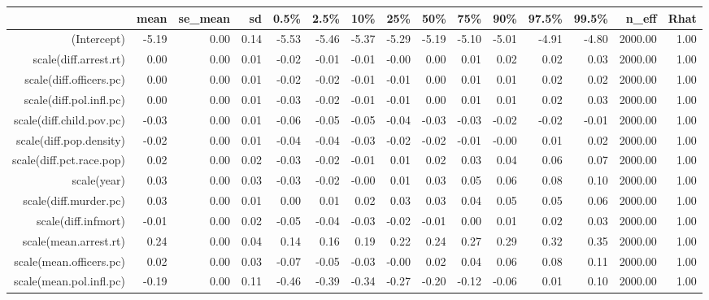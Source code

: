 \begin{table}[ht]
\centering
\begin{tabular}{rrrrrrrrrrrrrrr}
  \hline
 & mean & se\_mean & sd & 0.5\% & 2.5\% & 10\% & 25\% & 50\% & 75\% & 90\% & 97.5\% & 99.5\% & n\_eff & Rhat \\ 
  \hline
(Intercept) & -5.19 & 0.00 & 0.14 & -5.53 & -5.46 & -5.37 & -5.29 & -5.19 & -5.10 & -5.01 & -4.91 & -4.80 & 2000.00 & 1.00 \\ 
  scale(diff.arrest.rt) & 0.00 & 0.00 & 0.01 & -0.02 & -0.01 & -0.01 & -0.00 & 0.00 & 0.01 & 0.02 & 0.02 & 0.03 & 2000.00 & 1.00 \\ 
  scale(diff.officers.pc) & 0.00 & 0.00 & 0.01 & -0.02 & -0.02 & -0.01 & -0.01 & 0.00 & 0.01 & 0.01 & 0.02 & 0.02 & 2000.00 & 1.00 \\ 
  scale(diff.pol.infl.pc) & 0.00 & 0.00 & 0.01 & -0.03 & -0.02 & -0.01 & -0.01 & 0.00 & 0.01 & 0.01 & 0.02 & 0.03 & 2000.00 & 1.00 \\ 
  scale(diff.child.pov.pc) & -0.03 & 0.00 & 0.01 & -0.06 & -0.05 & -0.05 & -0.04 & -0.03 & -0.03 & -0.02 & -0.02 & -0.01 & 2000.00 & 1.00 \\ 
  scale(diff.pop.density) & -0.02 & 0.00 & 0.01 & -0.04 & -0.04 & -0.03 & -0.02 & -0.02 & -0.01 & -0.00 & 0.01 & 0.02 & 2000.00 & 1.00 \\ 
  scale(diff.pct.race.pop) & 0.02 & 0.00 & 0.02 & -0.03 & -0.02 & -0.01 & 0.01 & 0.02 & 0.03 & 0.04 & 0.06 & 0.07 & 2000.00 & 1.00 \\ 
  scale(year) & 0.03 & 0.00 & 0.03 & -0.03 & -0.02 & -0.00 & 0.01 & 0.03 & 0.05 & 0.06 & 0.08 & 0.10 & 2000.00 & 1.00 \\ 
  scale(diff.murder.pc) & 0.03 & 0.00 & 0.01 & 0.00 & 0.01 & 0.02 & 0.03 & 0.03 & 0.04 & 0.05 & 0.05 & 0.06 & 2000.00 & 1.00 \\ 
  scale(diff.infmort) & -0.01 & 0.00 & 0.02 & -0.05 & -0.04 & -0.03 & -0.02 & -0.01 & 0.00 & 0.01 & 0.02 & 0.03 & 2000.00 & 1.00 \\ 
  scale(mean.arrest.rt) & 0.24 & 0.00 & 0.04 & 0.14 & 0.16 & 0.19 & 0.22 & 0.24 & 0.27 & 0.29 & 0.32 & 0.35 & 2000.00 & 1.00 \\ 
  scale(mean.officers.pc) & 0.02 & 0.00 & 0.03 & -0.07 & -0.05 & -0.03 & -0.00 & 0.02 & 0.04 & 0.06 & 0.08 & 0.11 & 2000.00 & 1.00 \\ 
  scale(mean.pol.infl.pc) & -0.19 & 0.00 & 0.11 & -0.46 & -0.39 & -0.34 & -0.27 & -0.20 & -0.12 & -0.06 & 0.01 & 0.10 & 2000.00 & 1.00 \\ 

\end{tabular}
\end{table}
